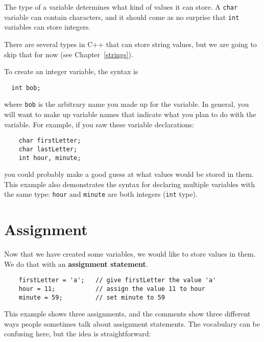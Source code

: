 The type of a variable determines what kind of values it can
store.  A {\tt char} variable can contain characters, and it should
come as no surprise that {\tt int} variables can store integers.

There are several types in C++ that can store string values, but we
are going to skip that for now (see Chapter~\ref{strings}).


To create an integer variable, the syntax is 

\begin{mdframed}

\begin{verbatim}
  int bob;
\end{verbatim}
%

\end{mdframed}
where {\tt bob} is the arbitrary name you made up for the
variable.  In general, you will want to make up variable names
that indicate what you plan to do with the variable.  For
example, if you saw these variable declarations:

\begin{mdframed}

\begin{verbatim}
    char firstLetter;
    char lastLetter;
    int hour, minute;
\end{verbatim}
\end{mdframed}
%

you could probably make a good guess at what values
would be stored in them.  This example
also demonstrates the syntax for declaring multiple variables
with the same type: {\tt hour} and {\tt minute}
are both integers ({\tt int} type).

\section{Assignment}

Now that we have created some variables, we would like to
store values in them.  We do that with an {\bf assignment
statement}.

\begin{mdframed}

\begin{verbatim}
    firstLetter = 'a';   // give firstLetter the value 'a'
    hour = 11;           // assign the value 11 to hour
    minute = 59;         // set minute to 59
\end{verbatim}
\end{mdframed}
%
This example shows three assignments, and the comments show
three different ways people sometimes talk about assignment
statements.  The vocabulary can be confusing here, but the
idea is straightforward:

